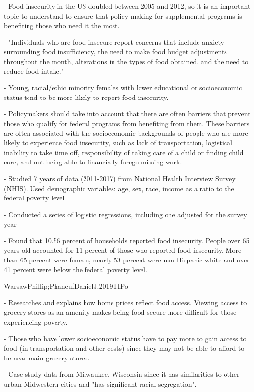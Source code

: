 \documentclass[12pt,english]{article}
\begin{document}
- Food insecurity in the US doubled between 2005 and 2012, so it is an important topic to understand to ensure that policy making for supplemental programs is benefiting those who need it the most. 

- "Individuals who are food insecure report concerns that include anxiety surrounding food insufficiency, the need to make food budget adjustments throughout the month, alterations in the types of food obtained, and the need to reduce food intake."

- Young, racial/ethic minority females with lower educational or socioeconomic status tend to be more likely to report food insecurity.

- Policymakers should take into account that there are often barriers that prevent those who qualify for federal programs from benefiting from them. These barriers are often associated with the socioeconomic backgrounds of people who are more likely to experience food insecurity, such as lack of transportation, logistical inability to take time off, responsibility of taking care of a child or finding child care, and not being able to financially forego missing work. 

- Studied 7 years of data (2011-2017) from National Health Interview Survey (NHIS). Used demographic variables: age, sex, race, income as a ratio to the federal poverty level

- Conducted a series of logistic regressions, including one adjusted for the survey year

- Found that 10.56 percent of households reported food insecurity. People over 65 years old accounted for 11 percent of those who reported food insecurity. More than 65 percent were female, nearly 53 percent were non-Hispanic white and over 41 percent were below the federal poverty level.


\citet{WarsawPhillip;PhaneufDanielJ.2019TIPo}
WarsawPhillip;PhaneufDanielJ.2019TIPo

- Researches and explains how home prices reflect food access. Viewing access to grocery stores as an amenity makes being food secure more difficult for those experiencing poverty. 

- Those who have lower socioeconomic status have to pay more to gain access to food (in transportation and other costs) since they may not be able to afford to be near main grocery stores. 

- Case study data from Milwaukee, Wisconsin since it has similarities to other urban Midwestern cities and "has significant racial segregation".
\end{document}
